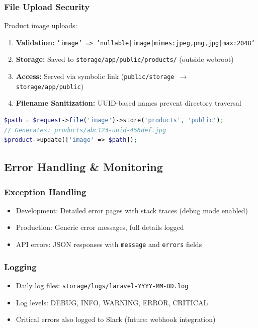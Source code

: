\subsubsection{File Upload Security}

Product image uploads:

\begin{enumerate}
    \item \textbf{Validation:} \texttt{'image' => 'nullable|image|mimes:jpeg,png,jpg|max:2048'}
    \item \textbf{Storage:} Saved to \texttt{storage/app/public/products/} (outside webroot)
    \item \textbf{Access:} Served via symbolic link (\texttt{public/storage $\rightarrow$ storage/app/public})
    \item \textbf{Filename Sanitization:} UUID-based names prevent directory traversal
\end{enumerate}

\begin{lstlisting}[language=PHP,label=lst:image-upload]
$path = $request->file('image')->store('products', 'public');
// Generates: products/abc123-uuid-456def.jpg
$product->update(['image' => $path]);
\end{lstlisting}

\subsection{Error Handling \& Monitoring}

\subsubsection{Exception Handling}

\begin{itemize}
    \item Development: Detailed error pages with stack traces (debug mode enabled)
    \item Production: Generic error messages, full details logged
    \item API errors: JSON responses with \texttt{message} and \texttt{errors} fields
\end{itemize}

\subsubsection{Logging}

\begin{itemize}
    \item Daily log files: \texttt{storage/logs/laravel-YYYY-MM-DD.log}
    \item Log levels: DEBUG, INFO, WARNING, ERROR, CRITICAL
    \item Critical errors also logged to Slack (future: webhook integration)
\end{itemize}

